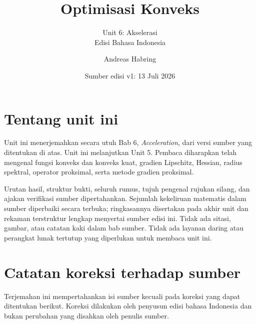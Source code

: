 \documentclass[indonesian]{shinybook}
\title{Optimisasi Konveks}
\subtitle{Unit 6: Akselerasi\\Edisi Bahasa Indonesia}
\author{Andreas Habring}
\date{Sumber edisi v1: 13 Juli 2026}
\begin{document}
\maketitle

\frontmatter
\chapter*{Tentang unit ini}
Unit ini menerjemahkan secara utuh Bab 6, \emph{Acceleration}, dari versi sumber yang ditentukan di atas. Unit ini melanjutkan Unit 5. Pembaca diharapkan telah mengenal fungsi konveks dan konveks kuat, gradien Lipschitz, Hessian, radius spektral, operator proksimal, serta metode gradien proksimal.

Urutan hasil, struktur bukti, seluruh rumus, tujuh pengenal rujukan silang, dan ajakan verifikasi sumber dipertahankan. Sejumlah kekeliruan matematis dalam sumber diperbaiki secara terbuka; ringkasannya disertakan pada akhir unit dan rekaman terstruktur lengkap menyertai sumber edisi ini. Tidak ada sitasi, gambar, atau catatan kaki dalam bab sumber. Tidak ada layanan daring atau perangkat lunak tertutup yang diperlukan untuk membaca unit ini.

\tableofcontents
\mainmatter
\setcounter{chapter}{5}


\backmatter
\chapter*{Catatan koreksi terhadap sumber}
Terjemahan ini mempertahankan isi sumber kecuali pada koreksi yang dapat ditentukan berikut. Koreksi dilakukan oleh penyusun edisi bahasa Indonesia dan bukan perubahan yang disahkan oleh penulis sumber.
\end{document}
